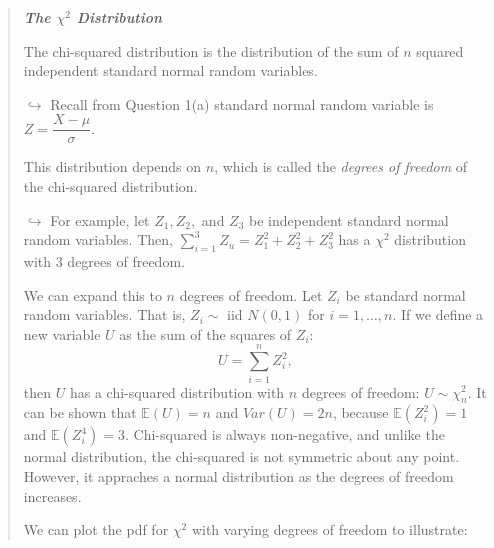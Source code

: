 \documentclass[
]{article}
\begin{document}
\begin{quote}
\textbf{\emph{The \(\chi^2\) Distribution}}

The chi-squared distribution is the distribution of the sum of \(n\)
squared independent standard normal random variables.

\(\hookrightarrow\) Recall from Question 1(a) standard normal random
variable is \(Z=\dfrac{X - \mu}{\sigma}.\)

This distribution depends on \(n\), which is called the \emph{degrees of
freedom} of the chi-squared distribution.

\(\hookrightarrow\) For example, let \(Z_1, Z_2,\) and \(Z_3\) be
independent standard normal random variables. Then,
\(\sum_{i=1}^3 Z_u = Z_1^2 + Z_2^2 + Z_3^2\) has a \(\chi^2\)
distribution with 3 degrees of freedom.

We can expand this to \(n\) degrees of freedom. Let \(Z_i\) be standard
normal random variables. That is, \(Z_i \sim\) iid \(N(0,1)\) for
\(i=1,\dots,n.\) If we define a new variable \(U\) as the sum of the
squares of \(Z_i\): \[
U = \displaystyle\sum_{i=1}^nZ_i^2,
\] then \(U\) has a chi-squared distribution with \(n\) degrees of
freedom: \(U \sim \chi_n^2.\) It can be shown that \(\mathbb{E}(U)=n\)
and \(Var(U)=2n\), because \(\mathbb{E}(Z_i^2)=1\) and
\(\mathbb{E}(Z_i^4)=3.\) Chi-squared is always non-negative, and unlike
the normal distribution, the chi-squared is not symmetric about any
point. However, it appraches a normal distribution as the degrees of
freedom increases.

We can plot the pdf for \(\chi^2\) with varying degrees of freedom to
illustrate:
\end{quote}
\end{document}
